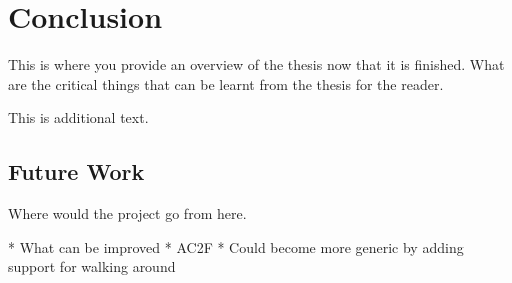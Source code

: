 \chapter{Conclusion}
\label{chap:conclusion}

This is where you provide an overview of the thesis now that it is finished.  What are the critical things that can be learnt from the thesis for the reader.

This is additional text.

\section{Future Work}
\label{sec:future}
Where would the project go from here.



* What can be improved
* AC2F
   * Could become more generic by adding support for walking around
